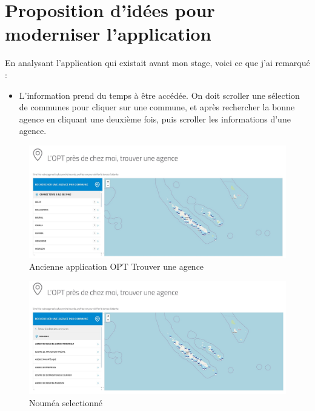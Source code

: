 \documentclass[12pt,a4paper]{report}
\begin{document}
\section{Proposition d'idées pour moderniser l'application}
En analysant l'application qui existait avant mon stage, voici ce que j'ai remarqué :
\begin{itemize}
    \item L'information prend du temps à être accédée. On doit scroller une sélection de communes pour cliquer sur une commune, et après rechercher la bonne agence en cliquant une deuxième fois, puis scroller les informations d'une agence.
\end{itemize}
\begin{figure}[h] %
    \centering
    \includegraphics[width=1\textwidth]{ressources_rapport/ancien_app_opt.JPG}
    \caption{Ancienne application OPT Trouver une agence}
    \label{fig:exemple}
\end{figure}
\vspace{1cm}

\begin{figure}[h] %
    \centering
    \includegraphics[width=1\textwidth]{ressources_rapport/ancien_app_opt_noumea.JPG}
    \caption{Nouméa selectionné}
    \label{fig:exemple}
\end{figure}
\vspace{1cm}
\end{document}

